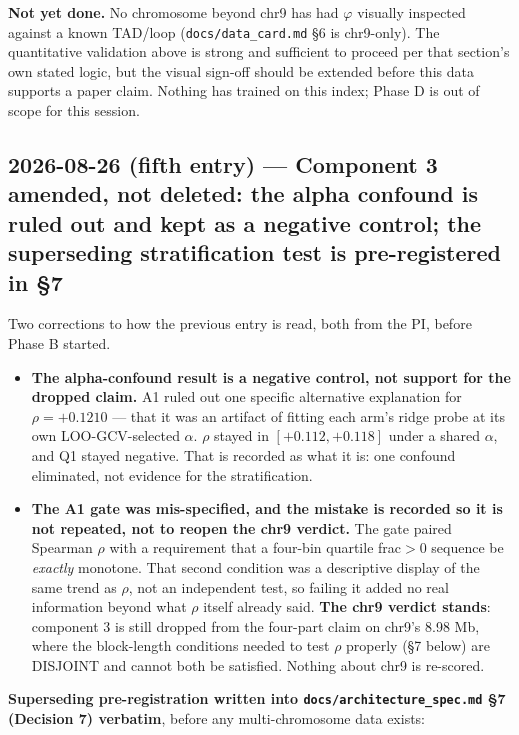 \documentclass[11pt,a4paper]{article}
\newcommand{\code}[1]{\texttt{\small #1}}
\begin{document}
\textbf{Not yet done.} No chromosome beyond chr9 has had $\varphi$ visually
inspected against a known TAD/loop (\code{docs/data\_card.md} \S6 is chr9-only).
The quantitative validation above is strong and sufficient to proceed per that
section's own stated logic, but the visual sign-off should be extended before
this data supports a paper claim. Nothing has trained on this index; Phase D
is out of scope for this session.

\subsection*{2026-08-26 (fifth entry) --- Component 3 amended, not deleted: the
alpha confound is ruled out and kept as a negative control; the superseding
stratification test is pre-registered in \S7}

Two corrections to how the previous entry is read, both from the PI, before
Phase B started.

\begin{itemize}
\item \textbf{The alpha-confound result is a negative control, not support for
the dropped claim.} A1 ruled out one specific alternative explanation for
$\rho = +0.1210$ --- that it was an artifact of fitting each arm's ridge probe
at its own LOO-GCV-selected $\alpha$. $\rho$ stayed in $[+0.112, +0.118]$ under
a shared $\alpha$, and Q1 stayed negative. That is recorded as what it is: one
confound eliminated, not evidence for the stratification.
\item \textbf{The A1 gate was mis-specified, and the mistake is recorded so it
is not repeated, not to reopen the chr9 verdict.} The gate paired Spearman
$\rho$ with a requirement that a four-bin quartile frac$>0$ sequence be
\emph{exactly} monotone. That second condition was a descriptive display of
the same trend as $\rho$, not an independent test, so failing it added no
real information beyond what $\rho$ itself already said. \textbf{The chr9
verdict stands}: component 3 is still dropped from the four-part claim on
chr9's 8.98 Mb, where the block-length conditions needed to test $\rho$
properly (\S7 below) are DISJOINT and cannot both be satisfied. Nothing about
chr9 is re-scored.
\end{itemize}

\textbf{Superseding pre-registration written into \code{docs/architecture\_spec.md}
\S7 (Decision 7) verbatim}, before any multi-chromosome data exists:
\end{document}
